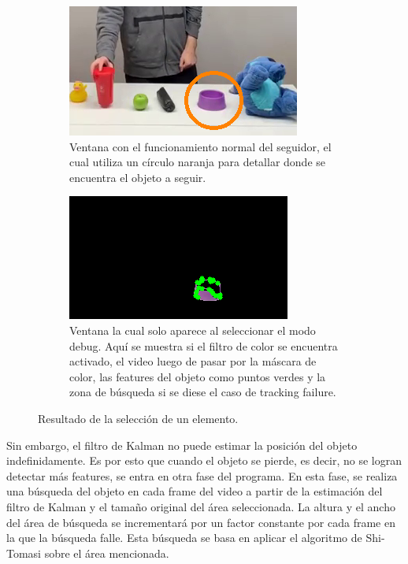 \begin{figure}[H]
\centering
	\begin{subfigure}{.4\textwidth}
		\centering
		\includegraphics[width=\textwidth]{Imagenes/Optical1.png}
		\caption{Ventana con el funcionamiento normal del seguidor, el cual utiliza un círculo naranja para detallar donde se encuentra el objeto a seguir.}
		\label{fig:optical1}
	\end{subfigure}
	\begin{subfigure}{.4\textwidth}
		\centering
		\includegraphics[width=\textwidth]{Imagenes/Optical2.png}
		\caption{Ventana la cual solo aparece al seleccionar el modo debug. Aquí se muestra si el filtro de color se encuentra activado, el video luego de pasar por la máscara de color, las features del objeto como puntos verdes y la zona de búsqueda si se diese el caso de tracking failure.}
		\label{fig:optical2}
	\end{subfigure}
	\caption{Resultado de la selección de un elemento.}
	\label{fig:optical12}
\end{figure}

Sin embargo, el filtro de Kalman no puede estimar la posición del objeto indefinidamente. Es por esto que cuando el objeto se pierde, es decir, no se logran detectar más features, se entra en otra fase del programa. En esta fase, se realiza una búsqueda del objeto en cada frame del video a partir de la estimación del filtro de Kalman y el tamaño original del área seleccionada. La altura y el ancho del área de búsqueda se incrementará por un factor constante por cada frame en la que la búsqueda falle. Esta búsqueda se basa en aplicar el algoritmo de Shi-Tomasi sobre el área mencionada.


